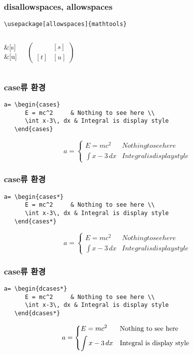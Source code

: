 \documentclass{beamer}
\begin{document}
\begin{frame}[fragile, t]
\frametitle{disallowspaces, allowspaces}
\begin{verbatim}
\usepackage[allowspaces]{mathtools}
\end{verbatim}

\begin{columns}[c]
\column{1.5in}
\begin{Verbatim*}
\begin{pmatrix*}
[r]&[s]\\
[t]&[u]
\end{pmatrix*}
\end{Verbatim*}
\column{1.5in}
\Large
\[
\begin{pmatrix*}
&[s]\\
[t]&[u]
\end{pmatrix*}
\]
\end{columns}
\end{frame}

\begin{frame}[fragile,t]
\frametitle{case류 환경}
\begin{verbatim}
a= \begin{cases}
      E = mc^2     & Nothing to see here \\
      \int x-3\, dx & Integral is display style
   \end{cases}
\end{verbatim}
\[
a= \begin{cases}
      E = mc^2     & Nothing to see here \\
      \int x-3\, dx & Integral is display style
   \end{cases}
\]
\end{frame}

\begin{frame}[fragile,t]
\frametitle{case류 환경}
\begin{verbatim}
a= \begin{cases*}
      E = mc^2     & Nothing to see here \\
      \int x-3\, dx & Integral is display style
   \end{cases*}
\end{verbatim}
\[
a= \begin{cases*}
      E = mc^2     & Nothing to see here \\
      \int x-3\, dx & Integral is display style
   \end{cases*}
\]
\end{frame}

\begin{frame}[fragile,t]
\frametitle{case류 환경}
\begin{verbatim}
a= \begin{dcases*}
      E = mc^2     & Nothing to see here \\
      \int x-3\, dx & Integral is display style
   \end{dcases*}
\end{verbatim}
\[
a= \begin{dcases*}
      E = mc^2     & Nothing to see here \\
      \int x-3\, dx & Integral is display style
   \end{dcases*}
\]
\end{frame}
\end{document}
